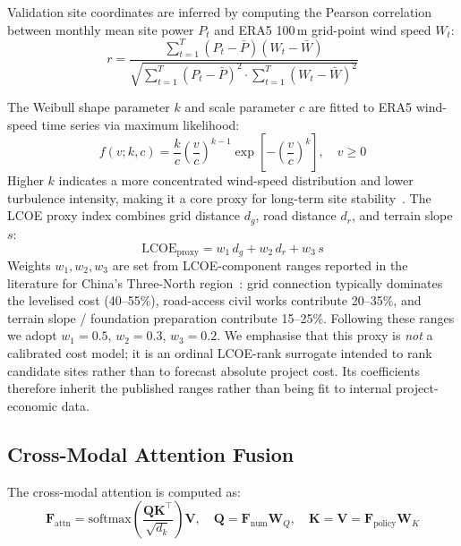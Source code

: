 \documentclass[12pt, a4paper]{article}
\begin{document}
Validation site coordinates are inferred by computing the
Pearson correlation between monthly mean site power $P_t$ and
ERA5 100\,m grid-point wind speed $W_t$:
\begin{equation}
r = \frac{\displaystyle\sum_{t=1}^{T}(P_t-\bar{P})(W_t-\bar{W})}
    {\sqrt{\displaystyle\sum_{t=1}^{T}(P_t-\bar{P})^2
     \cdot\sum_{t=1}^{T}(W_t-\bar{W})^2}}
\label{eq:pearson}
\end{equation}

The Weibull shape parameter $k$ and scale parameter $c$ are
fitted to ERA5 wind-speed time series via maximum likelihood:
\begin{equation}
f(v;k,c) = \frac{k}{c}\!\left(\frac{v}{c}\right)^{\!k-1}
\exp\!\left[-\left(\frac{v}{c}\right)^k\right], \quad v\geq0
\label{eq:weibull}
\end{equation}
Higher $k$ indicates a more concentrated wind-speed
distribution and lower turbulence intensity, making it a core
proxy for long-term site stability~\cite{jung2021}. The LCOE
proxy index combines grid distance $d_g$, road distance $d_r$,
and terrain slope $s$:
\begin{equation}
\text{LCOE}_{\text{proxy}} = w_1\,d_g + w_2\,d_r + w_3\,s
\label{eq:lcoe}
\end{equation}
Weights $w_1, w_2, w_3$ are set from LCOE-component ranges
reported in the literature for China's Three-North
region~\cite{zhong2022}: grid connection typically dominates
the levelised cost (40--55\%), road-access civil works
contribute 20--35\%, and terrain slope / foundation
preparation contribute 15--25\%. Following these ranges we
adopt $w_1 = 0.5$, $w_2 = 0.3$, $w_3 = 0.2$. We emphasise that
this proxy is \textit{not} a calibrated cost model; it is an
ordinal LCOE-rank surrogate intended to rank candidate sites
rather than to forecast absolute project cost. Its coefficients
therefore inherit the published ranges rather than being fit to
internal project-economic data.

\subsection{Cross-Modal Attention Fusion}

The cross-modal attention is computed as:
\begin{equation}
\mathbf{F}_\text{attn} =
  \text{softmax}\!\left(\frac{\mathbf{Q}\mathbf{K}^\top}{\sqrt{d_k}}
  \right)\mathbf{V},
\quad
\mathbf{Q}=\mathbf{F}_\text{num}\mathbf{W}_Q,
\quad
\mathbf{K}=\mathbf{V}=\mathbf{F}_\text{policy}\mathbf{W}_K
\label{eq:cross_attn}
\end{equation}
\end{document}
